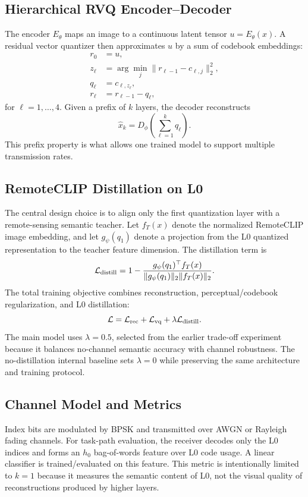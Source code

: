 \documentclass[lettersize,journal]{IEEEtran}
\begin{document}
\subsection{Hierarchical RVQ Encoder--Decoder}
The encoder $E_\theta$ maps an image to a continuous latent tensor $u=E_\theta(x)$. A residual vector quantizer then approximates $u$ by a sum of codebook embeddings:
\begin{align}
    r_0 &= u, \\
    z_\ell &= \arg\min_j \|r_{\ell-1}-c_{\ell,j}\|_2^2, \\
    q_\ell &= c_{\ell,z_\ell}, \\
    r_\ell &= r_{\ell-1}-q_\ell,
\end{align}
for $\ell=1,\ldots,4$. Given a prefix of $k$ layers, the decoder reconstructs
\begin{equation}
    \hat{x}_k = D_\phi\left(\sum_{\ell=1}^{k} q_\ell\right).
\end{equation}
This prefix property is what allows one trained model to support multiple transmission rates.

\subsection{RemoteCLIP Distillation on L0}
The central design choice is to align only the first quantization layer with a remote-sensing semantic teacher. Let $f_T(x)$ denote the normalized RemoteCLIP image embedding, and let $g_\psi(q_1)$ denote a projection from the L0 quantized representation to the teacher feature dimension. The distillation term is
\begin{equation}
    \mathcal{L}_{\rm distill}=1-\frac{g_\psi(q_1)^\top f_T(x)}{\|g_\psi(q_1)\|_2\|f_T(x)\|_2}.
\end{equation}
The total training objective combines reconstruction, perceptual/codebook regularization, and L0 distillation:
\begin{equation}
    \mathcal{L}=\mathcal{L}_{\rm rec}+\mathcal{L}_{\rm vq}+\lambda\mathcal{L}_{\rm distill}.
\end{equation}
The main model uses $\lambda=0.5$, selected from the earlier trade-off experiment because it balances no-channel semantic accuracy with channel robustness. The no-distillation internal baseline sets $\lambda=0$ while preserving the same architecture and training protocol.

\subsection{Channel Model and Metrics}
Index bits are modulated by BPSK and transmitted over AWGN or Rayleigh fading channels. For task-path evaluation, the receiver decodes only the L0 indices and forms an $h_0$ bag-of-words feature over L0 code usage. A linear classifier is trained/evaluated on this feature. This metric is intentionally limited to $k=1$ because it measures the semantic content of L0, not the visual quality of reconstructions produced by higher layers.
\end{document}
